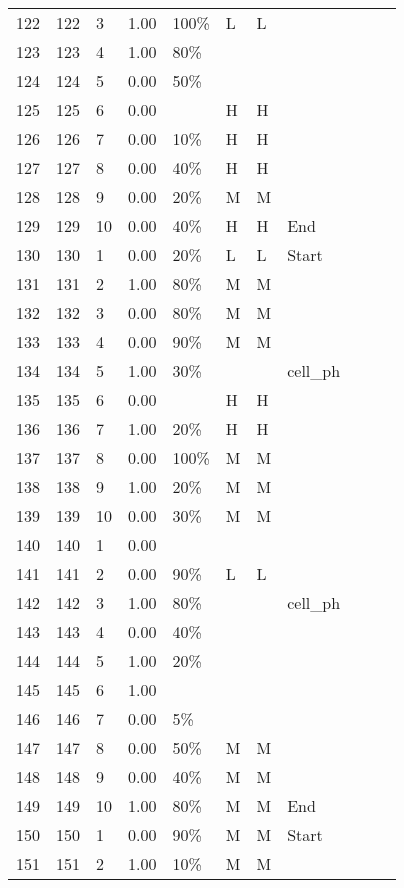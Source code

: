 \begin{longtable}{lllllllllll}
  122 & 122 &   3 & 1.00 & 100\% & L & L &  \\ 
  123 & 123 &   4 & 1.00 & 80\% &  &  &  \\ 
  124 & 124 &   5 & 0.00 & 50\% &  &  &  \\ 
  125 & 125 &   6 & 0.00 &  & H & H &  \\ 
  126 & 126 &   7 & 0.00 & 10\% & H & H &  \\ 
  127 & 127 &   8 & 0.00 & 40\% & H & H &  \\ 
  128 & 128 &   9 & 0.00 & 20\% & M & M &  \\ 
  129 & 129 &  10 & 0.00 & 40\% & H & H & End \\ 
  130 & 130 &   1 & 0.00 & 20\% & L & L & Start \\ 
  131 & 131 &   2 & 1.00 & 80\% & M & M &  \\ 
  132 & 132 &   3 & 0.00 & 80\% & M & M &  \\ 
  133 & 133 &   4 & 0.00 & 90\% & M & M &  \\ 
  134 & 134 &   5 & 1.00 & 30\% &  &  & cell\_ph \\ 
  135 & 135 &   6 & 0.00 &  & H & H &  \\ 
  136 & 136 &   7 & 1.00 & 20\% & H & H &  \\ 
  137 & 137 &   8 & 0.00 & 100\% & M & M &  \\ 
  138 & 138 &   9 & 1.00 & 20\% & M & M &  \\ 
  139 & 139 &  10 & 0.00 & 30\% & M & M &  \\ 
  140 & 140 &   1 & 0.00 &  &  &  &  \\ 
  141 & 141 &   2 & 0.00 & 90\% & L & L &  \\ 
  142 & 142 &   3 & 1.00 & 80\% &  &  & cell\_ph \\ 
  143 & 143 &   4 & 0.00 & 40\% &  &  &  \\ 
  144 & 144 &   5 & 1.00 & 20\% &  &  &  \\ 
  145 & 145 &   6 & 1.00 &  &  &  &  \\ 
  146 & 146 &   7 & 0.00 & 5\% &  &  &  \\ 
  147 & 147 &   8 & 0.00 & 50\% & M & M &  \\ 
  148 & 148 &   9 & 0.00 & 40\% & M & M &  \\ 
  149 & 149 &  10 & 1.00 & 80\% & M & M & End \\ 
  150 & 150 &   1 & 0.00 & 90\% & M & M & Start \\ 
  151 & 151 &   2 & 1.00 & 10\% & M & M &  \\ 

\end{longtable}
